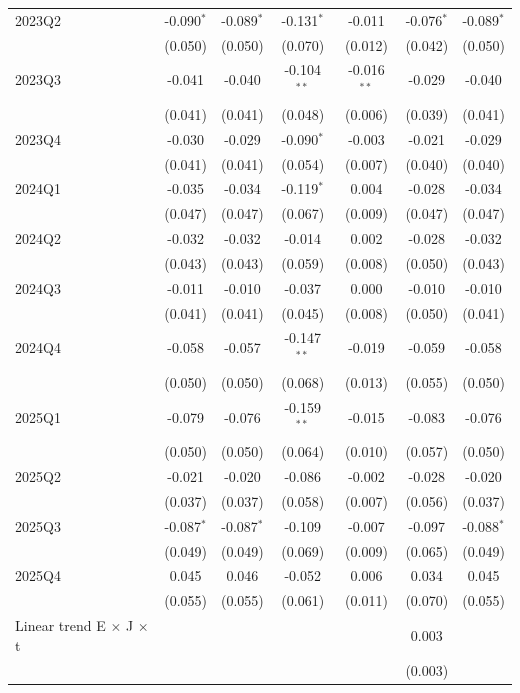 \begin{table}[htbp]
\begin{tabular}{lcccccc}
2023Q2 & -0.090$^{*}$ & -0.089$^{*}$ & -0.131$^{*}$ & -0.011 & -0.076$^{*}$ & -0.089$^{*}$ \\
 & (0.050) & (0.050) & (0.070) & (0.012) & (0.042) & (0.050) \\
2023Q3 & -0.041 & -0.040 & -0.104$^{**}$ & -0.016$^{**}$ & -0.029 & -0.040 \\
 & (0.041) & (0.041) & (0.048) & (0.006) & (0.039) & (0.041) \\
2023Q4 & -0.030 & -0.029 & -0.090$^{*}$ & -0.003 & -0.021 & -0.029 \\
 & (0.041) & (0.041) & (0.054) & (0.007) & (0.040) & (0.040) \\
2024Q1 & -0.035 & -0.034 & -0.119$^{*}$ & 0.004 & -0.028 & -0.034 \\
 & (0.047) & (0.047) & (0.067) & (0.009) & (0.047) & (0.047) \\
2024Q2 & -0.032 & -0.032 & -0.014 & 0.002 & -0.028 & -0.032 \\
 & (0.043) & (0.043) & (0.059) & (0.008) & (0.050) & (0.043) \\
2024Q3 & -0.011 & -0.010 & -0.037 & 0.000 & -0.010 & -0.010 \\
 & (0.041) & (0.041) & (0.045) & (0.008) & (0.050) & (0.041) \\
2024Q4 & -0.058 & -0.057 & -0.147$^{**}$ & -0.019 & -0.059 & -0.058 \\
 & (0.050) & (0.050) & (0.068) & (0.013) & (0.055) & (0.050) \\
2025Q1 & -0.079 & -0.076 & -0.159$^{**}$ & -0.015 & -0.083 & -0.076 \\
 & (0.050) & (0.050) & (0.064) & (0.010) & (0.057) & (0.050) \\
2025Q2 & -0.021 & -0.020 & -0.086 & -0.002 & -0.028 & -0.020 \\
 & (0.037) & (0.037) & (0.058) & (0.007) & (0.056) & (0.037) \\
2025Q3 & -0.087$^{*}$ & -0.087$^{*}$ & -0.109 & -0.007 & -0.097 & -0.088$^{*}$ \\
 & (0.049) & (0.049) & (0.069) & (0.009) & (0.065) & (0.049) \\
2025Q4 & 0.045 & 0.046 & -0.052 & 0.006 & 0.034 & 0.045 \\
 & (0.055) & (0.055) & (0.061) & (0.011) & (0.070) & (0.055) \\
Linear trend E $\times$ J $\times$ t &  &  &  &  & 0.003 &  \\
 &  &  &  &  & (0.003) &  \\
\bottomrule
\end{tabular}
\par\vspace{2pt}{\footnotesize Reference quarter 2022Q3 omitted. Standard errors clustered on occupation in parentheses. * p<0.10, ** p<0.05, *** p<0.01. Model 2 replaces the pre-period dummies with the linear trend; its post coefficients are deviations from the extrapolated trend.}
\end{table}
